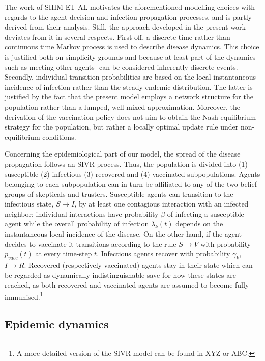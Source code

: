 \documentclass[11pt]{article}
\begin{document}
The work of SHIM ET AL motivates the aforementioned modelling choices with regards to the agent decision and infection propagation processes, and is partly derived from their analysis. Still, the approach developed in the present work deviates from it in several respects. First off, a discrete-time rather than continuous time Markov process is used to describe disease dynamics. This choice is justified both on simplicity grounds and because at least part of the dynamics -such as meeting other agents- can be considered inherently discrete events. Secondly, individual transition probabilities are based on the local instantaneous incidence of infection rather than the steady endemic distribution. The latter is justified by the fact that the present model employs a network structure for the population rather than a lumped, well mixed approximation. Moreover, the derivation of the vaccination policy does not aim to obtain the Nash equilibrium strategy for the population, but rather a locally optimal update rule under non-equilibrium conditions.

Concerning the epidemiological part of our model, the spread of the disease propagation follows an SIVR-process. Thus, the population is divided into (1) susceptible (2) infectious (3) recovered and (4) vaccinated subpopulations. Agents belonging to each subpopulation can in turn be affiliated to any of the two belief-groups of skepticals and trusters. Susceptible agents can transition to the infectious state, \(S \rightarrow{} I \), by at least one contagious interaction with an infected neighbor; individual interactions have probability \(\beta\) of infecting a susceptible agent while the overall probability of infection \(\lambda_{k}(t)\) depends on the instantaneous local incidence of the disease. On the other hand, if the agent decides to vaccinate it transitions according to the rule \(S \rightarrow{} V \) with probability \(p_{vacc}(t)\) at every time-step \(t\). Infectious agents recover with probability \(\gamma_{k}\), \(I \rightarrow{} R\). Recovered (respectively vaccinated) agents stay in their state which can be regarded as dynamically indistinguishable save for how these states are reached, as both recovered and vaccinated agents are assumed to become fully immunised.\footnote{A more detailed version of the SIVR-model can be found in XYZ or ABC.}

\subsection{Epidemic dynamics}
\end{document}
